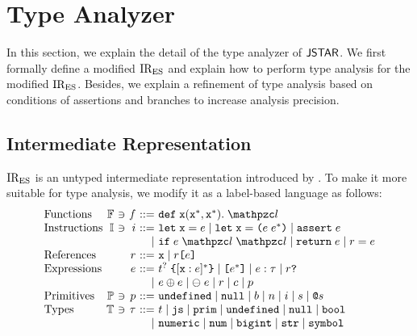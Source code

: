 \section{Type Analyzer}\label{sec:analyzer}

In this section, we explain the detail of the type analyzer of $\textsf{JSTAR}$. We first
formally define a modified ${\text{IR}_\text{ES}}$ and explain how to perform type analysis
for the modified ${\text{IR}_\text{ES}}$.  Besides, we explain a refinement of type analysis
based on conditions of assertions and branches to increase analysis precision.

\subsection{Intermediate Representation}\label{sec:ires}

${\text{IR}_\text{ES}}$ is an untyped intermediate representation introduced by \citet{jiset}.
To make it more suitable for type analysis, we modify it as a label-based
language as follows:
\[
  \begin{array}{l@{~}r@{~}c@{~}r@{~}r@{~}l}
    \text{Functions}
    &\funcset&\ni&\func&::=&\kwdef \; \x (\x^*, \x^*). \; \lab\\

    \text{Instructions}
    &\instset&\ni&\inst&::=&
    \kwlet \; \x = \expr \mid
    \kwlet \; \x = \kwrl \expr \; \expr^* \kwrr \mid
    \kwassert \; \expr \\

    &&&&\mid&
    \kwif \; \expr \; \lab \; \lab \mid
    \kwreturn \; \expr \mid
    \refer = \expr \\

    \text{References}
    &&&\refer&::=&
    \x \mid
    \refer \kwsl \expr \kwsr \\

    \text{Expressions}
    &&&\expr&::=&
    \tname^? \; \kwcl [\x: \expr]^* \kwcr \mid
    \kwsl \expr^* \kwsr \mid
    \expr: \ty \mid
    \refer \kwexists \\

    &&&&\mid&
    \expr \bop \expr \mid
    \uop \; \expr \mid
    \refer \mid
    \const \mid
    \prim \\

    \text{Primitives}
    &\primset&\ni&\prim&::=&
    \undefval \mid \nullval \mid \bool \mid
    \num \mid \bigint \mid \str \mid \symb \\

    \text{Types}
    &\tyset&\ni&\ty&::=&\tname \mid \tjs \mid \tprim \mid
    \undefval \mid \nullval \mid \tbool\\

    &&&&\mid&
    \tnumeric \mid \tnum \mid \tbigint \mid \tstr \mid \tsymb \\
  \end{array}
\]
